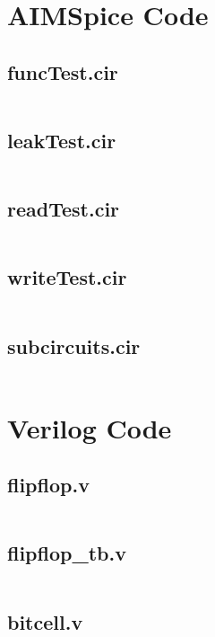 \section*{AIMSpice Code}

\subsection*{funcTest.cir}
\inputminted{text}{../aimSpice/funcTest.cir}

\subsection*{leakTest.cir}
\inputminted{text}{../aimSpice/leakTest.cir}

\subsection*{readTest.cir}
\inputminted{text}{../aimSpice/readTest.cir}

\subsection*{writeTest.cir}
\inputminted{text}{../aimSpice/writeTest.cir}

\subsection*{subcircuits.cir}
\inputminted{text}{../aimSpice/subcircuits.cir}

\section*{Verilog Code}

\subsection*{flipflop.v}
\inputminted{verilog}{../verilog_mem8x8_m_tri_state_buffer/flipflop.v}

\subsection*{flipflop_tb.v}
\inputminted{verilog}{../verilog_mem8x8_m_tri_state_buffer/flipflop_tb.v}

\subsection*{bitcell.v}
\inputminted{verilog}{../verilog_mem8x8_m_tri_state_buffer/bitcell.v}

